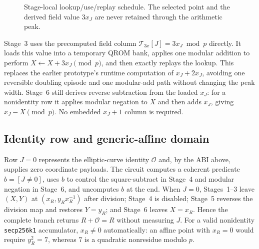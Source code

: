 \documentclass[10pt]{article}
\begin{document}
\begin{figure}[ht]
{}
\caption{Stage-local lookup/use/replay schedule. The selected point and the derived field value $3x_J$ are never retained through the arithmetic peak.}
\label{fig:stage-schedule}
\end{figure}

Stage~3 uses the precomputed field column $\mathcal T_{3x}[J]=3x_J\bmod p$ directly. It loads this value into a temporary QROM bank, applies one modular addition to perform $X\gets X+3x_J\pmod p$, and then exactly replays the lookup. This replaces the earlier prototype's runtime computation of $x_J+2x_J$, avoiding one reversible doubling episode and one modular-add path without changing the peak width. Stage~6 still derives reverse subtraction from the loaded $x_J$: for a nonidentity row it applies modular negation to $X$ and then adds $x_J$, giving $x_J-X\pmod p$. No embedded $x_J+1$ column is required.

\subsection{Identity row and generic-affine domain}

Row $J=0$ represents the elliptic-curve identity $\mathcal O$ and, by the ABI above, supplies zero coordinate payloads. The circuit computes a coherent predicate $b=[J\neq0]$, uses $b$ to control the square-subtract in Stage~4 and modular negation in Stage~6, and uncomputes $b$ at the end. When $J=0$, Stages~1--3 leave $(X,Y)$ at $(x_R,y_Rx_R^{-1})$ after division; Stage~4 is disabled; Stage~5 reverses the division map and restores $Y=y_R$; and Stage~6 leaves $X=x_R$. Hence the complete branch returns $R+\mathcal O=R$ without measuring $J$. For a valid nonidentity \texttt{secp256k1} accumulator, $x_R\neq0$ automatically: an affine point with $x_R=0$ would require $y_R^2=7$, whereas $7$ is a quadratic nonresidue modulo $p$.
\end{document}
